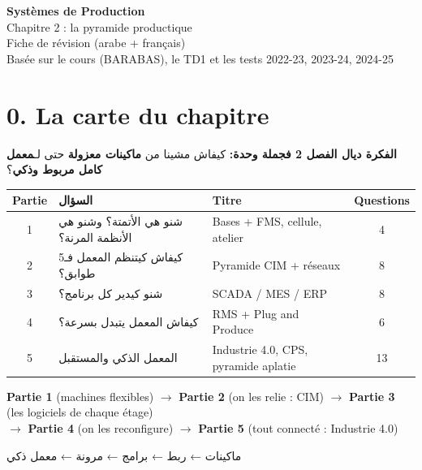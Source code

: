\documentclass[11pt,a4paper]{article}
\newcommand{\ar}[1]{\textarabic{#1}}
\begin{document}
\begin{center}
{\LARGE\bfseries Systèmes de Production}\\[4pt]
{\Large Chapitre 2 : la pyramide productique}\\[4pt]
{\large Fiche de révision (arabe + français)}\\[2pt]
{\small Basée sur le cours (BARABAS), le TD1 et les tests 2022-23, 2023-24, 2024-25}
\end{center}

\section*{0. La carte du chapitre}

\par\begin{Arabic}
\textbf{الفكرة ديال الفصل 2 فجملة وحدة:} كيفاش مشينا من \textbf{ماكينات معزولة} حتى لـ\textbf{معمل كامل مربوط وذكي}؟
\end{Arabic}

\begin{center}
\begin{tabularx}{\linewidth}{c >{\raggedleft\arraybackslash}X l c}
\toprule
\textbf{Partie} & \ar{\textbf{السؤال}} & \textbf{Titre} & \textbf{Questions} \\
\midrule
1 & \ar{شنو هي الأتمتة؟ وشنو هي الأنظمة المرنة؟} & Bases + FMS, cellule, atelier & 4 \\
2 & \ar{كيفاش كيتنظم المعمل فـ5 طوابق؟} & Pyramide CIM + réseaux & 8 \\
3 & \ar{شنو كيدير كل برنامج؟} & SCADA / MES / ERP & 8 \\
4 & \ar{كيفاش المعمل يتبدل بسرعة؟} & RMS + Plug and Produce & 6 \\
5 & \ar{المعمل الذكي والمستقبل} & Industrie 4.0, CPS, pyramide aplatie & 13 \\
\bottomrule
\end{tabularx}
\end{center}

\begin{tcolorbox}[colback=bleu!4,colframe=bleu,title=La chaîne logique du chapitre,fonttitle=\bfseries]
\centering
\textbf{Partie 1} (machines flexibles) $\longrightarrow$ \textbf{Partie 2} (on les relie : CIM) $\longrightarrow$ \textbf{Partie 3} (les logiciels de chaque étage)\\[3pt]
$\longrightarrow$ \textbf{Partie 4} (on les reconfigure) $\longrightarrow$ \textbf{Partie 5} (tout connecté : Industrie 4.0)
\par\begin{Arabic}
\centering
ماكينات ← ربط ← برامج ← مرونة ← معمل ذكي
\end{Arabic}
\end{tcolorbox}
\end{document}
